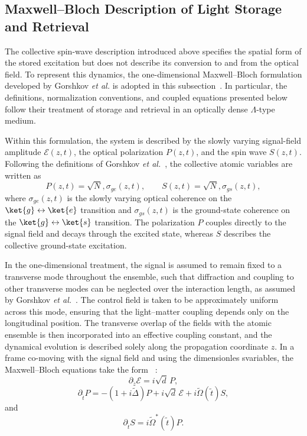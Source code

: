 \subsection{Maxwell--Bloch Description of Light Storage and Retrieval}

The collective spin-wave description introduced above specifies the spatial form of the stored excitation but does not describe its conversion to and from the optical field. To represent this dynamics, the one-dimensional Maxwell--Bloch formulation developed by Gorshkov \emph{et al.} is adopted in this subsection~\cite{PsiL-odamIFm_GorshkovEtAl_2007}. In particular, the definitions, normalization conventions, and coupled equations presented below follow their treatment of storage and retrieval in an optically dense $\Lambda$-type medium.

Within this formulation, the system is described by the slowly varying signal-field amplitude $\mathcal{E}(z,t)$, the optical polarization $P(z,t)$, and the spin wave $S(z,t)$. Following the definitions of Gorshkov \emph{et al.}~\cite{PsiL-odamIFm_GorshkovEtAl_2007}, the collective atomic variables are written as
\begin{equation}
P(z,t)
=
\sqrt{N},\sigma_{ge}(z,t),
\qquad
S(z,t)
=
\sqrt{N},\sigma_{gs}(z,t),
\label{eq}
\end{equation}
where $\sigma_{ge}(z,t)$ is the slowly varying optical coherence on the $\ket{g}\leftrightarrow\ket{e}$ transition and $\sigma_{gs}(z,t)$ is the ground-state coherence on the $\ket{g}\leftrightarrow\ket{s}$ transition. The polarization $P$ couples directly to the signal field and decays through the excited state, whereas $S$ describes the collective ground-state excitation.

In the one-dimensional treatment, the signal is assumed to remain fixed to a transverse mode throughout the ensemble, such that diffraction and coupling to other transverse modes can be neglected over the interaction length, as assumed by Gorshkov \emph{et al.}~\cite{PsiL-odamIFm_GorshkovEtAl_2007}. The control field is taken to be approximately uniform across this mode, ensuring that the light--matter coupling depends only on the longitudinal position. The transverse overlap of the fields with the atomic ensemble is then incorporated into an effective coupling constant, and the dynamical evolution is described solely along the propagation coordinate $z$.
In a frame co-moving with the signal field and using the dimensionles svariables, the Maxwell--Bloch equations take the form ~\cite{PsiL-odamIFm_GorshkovEtAl_2007}:
\begin{equation}
    \partial_{\tilde{z}}\mathcal{E}
    =
    i\sqrt{d}\,P,
    \label{eq:gorshkov_field}
\end{equation}
\begin{equation}
    \partial_{\tilde{t}}P
    =
    -\left(1+i\tilde{\Delta}\right)P
    +
    i\sqrt{d}\,\mathcal{E}
    +
    i\tilde{\Omega}(\tilde{t})S,
    \label{eq:gorshkov_polarization}
\end{equation}
and
\begin{equation}
    \partial_{\tilde{t}}S
    =
    i\tilde{\Omega}^{*}(\tilde{t})P.
    \label{eq:gorshkov_spin_wave}
\end{equation}

